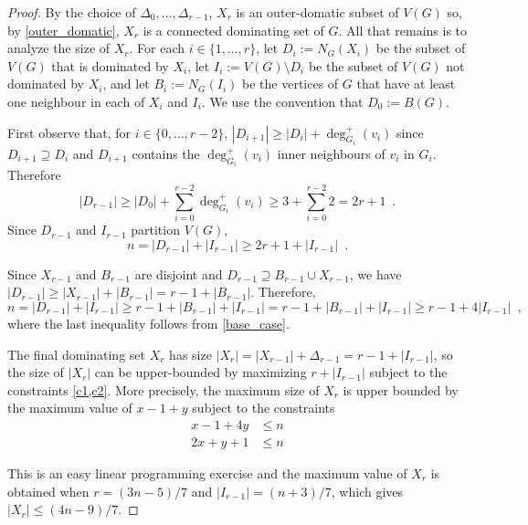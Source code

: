 \documentclass[12pt]{article}
\begin{document}
\begin{proof}
By the choice of $\Delta_0,\ldots,\Delta_{r-1}$, $X_r$ is an outer-domatic subset of $V(G)$ so, by \cref{outer_domatic}, $X_r$ is a connected dominating set of $G$.  All that remains is to analyze the size of $X_r$.  For each $i\in\{1,\ldots,r\}$, let $D_i:=N_G(X_i)$ be the subset of $V(G)$ that is dominated by $X_i$, let $I_i:=V(G)\setminus D_i$ be the subset of $V(G)$ not dominated by $X_i$, and let $B_i:=N_G(I_i)$ be the vertices of $G$ that have at least one neighbour in each of $X_i$ and $I_i$.  We use the convention that $D_0:=B(G)$.

First observe that, for $i\in\{0,\ldots,r-2\}$, $|D_{i+1}|\ge |D_i|+\deg_{G_i}^+(v_i)$ since $D_{i+1}\supseteq D_i$ and $D_{i+1}$ contains the $\deg_{G_i}^+(v_i)$ inner neighbours of $v_i$ in $G_i$.  Therefore
\[
    |D_{r-1}| \ge |D_0| + \sum_{i=0}^{r-2} \deg_{G_i}^+(v_i) \ge 3 + \sum_{i=0}^{r-2} 2 =  2r+1 \enspace . \label{double_d}
\]
Since $D_{r-1}$ and $I_{r-1}$ partition $V(G)$, 
\begin{equation}
  n = |D_{r-1}| + |I_{r-1}| \ge 2r+1 + |I_{r-1}|  \enspace . \label{c1}
\end{equation}

Since $X_{r-1}$ and $B_{r-1}$ are disjoint and $D_{r-1}\supseteq B_{r-1}\cup X_{r-1}$, we have $|D_{r-1}|\ge |X_{r-1}| + |B_{r-1}|=r-1+|B_{r-1}|$.  Therefore, 
\begin{equation}
    n = |D_{r-1}| + |I_{r-1}| \ge r-1 + |B_{r-1}| + |I_{r-1}| = r-1 + |B_{r-1}| + |I_{r-1}|
    \ge r - 1 + 4|I_{r-1}| \enspace , \label{c2}
\end{equation}
where the last inequality follows from \cref{base_case}.  

The final dominating set $X_r$ has size $|X_r| = |X_{r-1}| + \Delta_{r-1} = r - 1 +|I_{r-1}|$, so the size of $|X_r|$ can be upper-bounded by maximizing $r+|I_{r-1}|$ subject to the constraints \cref{c1,c2}.  More precisely, the maximum size of $X_r$ is upper bounded by the maximum value of $x-1+y$ subject to the constraints
\begin{align*}
  x - 1 + 4y & \le n \\
  2x + y +1 & \le n
\end{align*}

This is an easy linear programming exercise and the maximum value of $X_{r}$ is obtained when $r=(3n-5)/7$ and $|I_{r-1}|=(n+3)/7$, which gives
$|X_r| \le (4n-9)/7$.
\end{proof}
\end{document}
